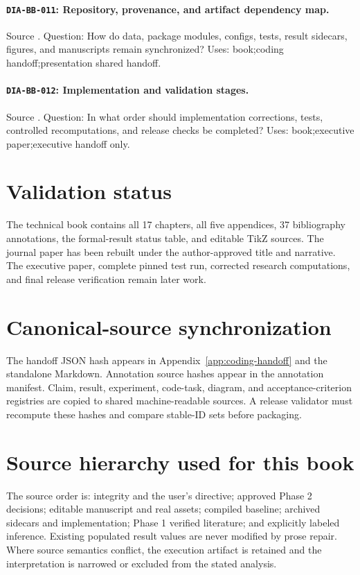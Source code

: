 \paragraph{\texttt{DIA-BB-011}: Repository, provenance, and artifact dependency map.} Source . Question: How do data, package modules, configs, tests, result sidecars, figures, and manuscripts remain synchronized? Uses: book;coding handoff;presentation shared handoff.
\paragraph{\texttt{DIA-BB-012}: Implementation and validation stages.} Source . Question: In what order should implementation corrections, tests, controlled recomputations, and release checks be completed? Uses: book;executive paper;executive handoff only.

\section{Validation status}
The technical book contains all 17 chapters, all five appendices, 37 bibliography annotations, the formal-result status table, and editable TikZ sources. The journal paper has been rebuilt under the author-approved title and narrative. The executive paper, complete pinned test run, corrected research computations, and final release verification remain later work.

\section{Canonical-source synchronization}
The handoff JSON hash appears in Appendix~\ref{app:coding-handoff} and the standalone Markdown.
Annotation source hashes appear in the annotation manifest. Claim, result, experiment, code-task,
diagram, and acceptance-criterion registries are copied to shared machine-readable sources. A release validator
must recompute these hashes and compare stable-ID sets before packaging.

\section{Source hierarchy used for this book}
The source order is: integrity and the user's directive; approved Phase 2 decisions; editable
manuscript and real assets; compiled baseline; archived sidecars and implementation; Phase 1
verified literature; and explicitly labeled inference. Existing populated result values are never
modified by prose repair. Where source semantics conflict, the execution artifact is retained and
the interpretation is narrowed or excluded from the stated analysis.
